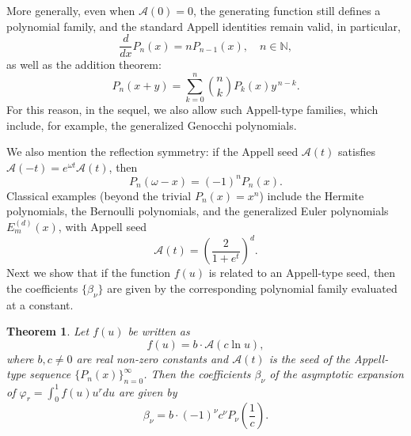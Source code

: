 \documentclass[10pt,reqno,a4paper]{amsart}%
\newtheorem{theorem}{Theorem}
\newtheorem{lem}[theorem]{Lemma}
\theoremstyle{definition}
\newcommand{\N}{\ensuremath{\mathbb{N}}}
\newcommand{\ap}{\ensuremath{\mathcal{A}}}%
\begin{document}
More generally, even when $\ap(0)=0$, the generating function still
defines a polynomial family, and the standard Appell identities remain valid,
in particular,
\[
\frac{d}{dx}P_{n}(x)=nP_{n-1}(x),\quad n\in\mathbb{N},
\]
as well as the addition theorem:
\begin{equation}
P_{n}(x+y)=\sum_{k=0}^{n}\binom{n}{k}P_{k}(x)y^{\,n-k}.
\label{eqn:AppellAdditionThm}%
\end{equation}
For this reason, in the sequel, we also allow such Appell-type families, which
include, for example, the generalized Genocchi polynomials.

We also mention the reflection symmetry: if the Appell seed $\ap(t)$
satisfies $\ap(-t)=e^{\omega t}\ap(t)$, then
\begin{equation}
P_{n}(\omega-x)=(-1)^{n}P_{n}(x). \label{eqn:AppellReflect}%
\end{equation}
Classical examples (beyond the trivial $P_{n}(x)=x^{n}$) include the Hermite
polynomials, the Bernoulli polynomials, and the generalized Euler polynomials
$E_{m}^{(d)}(x)$, with Appell seed
\[
\ap(t)=\left(  \frac{2}{1+e^{t}}\right)  ^{d}.
\]
Next we show that if the function $f(u)$ is related to an Appell-type seed,
then the coefficients $\{\beta_{\nu}\}$ are given by the corresponding
polynomial family evaluated at a constant.

\begin{theorem}
\label{Prop:Appell} Let $f(u)$ be written as
\begin{equation}
f(u)=b\cdot\ap(c\ln u), \label{eqn:f}%
\end{equation}
where $b,c\neq0$ are real non-zero constants and $\ap(t)$ is the seed
of the Appell-type sequence $\{P_{n}(x)\}_{n=0}^{\infty}$. Then the
coefficients $\beta_{\nu}$ of the asymptotic expansion of $\varphi_{r}%
=\int_{0}^{1}f(u)u^{r}du$ are given by
\begin{equation}
\beta_{\nu}=b\cdot(-1)^{\nu}c^{\nu}P_{\nu}\!\left(  \frac{1}{c}\right)  .
\end{equation}

\end{theorem}
\end{document}
